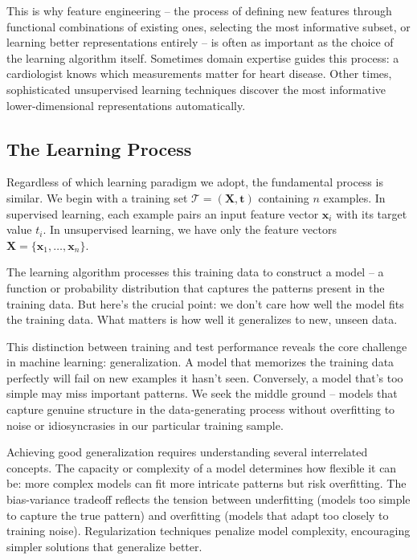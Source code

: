 This is why \alert{feature engineering} -- the process of defining new features through functional combinations of existing ones, selecting the most informative subset, or learning better representations entirely -- is often as important as the choice of the learning algorithm itself. Sometimes domain expertise guides this process: a cardiologist knows which measurements matter for heart disease. Other times, sophisticated unsupervised learning techniques discover the most informative lower-dimensional representations automatically.


\subsection*{The Learning Process}

Regardless of which learning paradigm we adopt, the fundamental process is similar. We begin with a \alert{training set} $\mathcal{T} = (\mathbf{X}, \mathbf{t})$ containing $n$ examples. In supervised learning, each example pairs an input feature vector $\mathbf{x}_i$ with its target value $t_i$. In unsupervised learning, we have only the feature vectors $\mathbf{X} = \{\mathbf{x}_1, \ldots, \mathbf{x}_n\}$.

The learning algorithm processes this training data to construct a model -- a function or probability distribution that captures the patterns present in the training data. But here's the crucial point: we don't care how well the model fits the training data. What matters is how well it generalizes to new, unseen data.

This distinction between training and test performance reveals the core challenge in machine learning: \alert{generalization}. A model that memorizes the training data perfectly will fail on new examples it hasn't seen. Conversely, a model that's too simple may miss important patterns. We seek the middle ground -- models that capture genuine structure in the data-generating process without overfitting to noise or idiosyncrasies in our particular training sample.

Achieving good generalization requires understanding several interrelated concepts. The \alert{capacity} or \alert{complexity} of a model determines how flexible it can be: more complex models can fit more intricate patterns but risk overfitting. The \alert{bias-variance tradeoff} reflects the tension between underfitting (models too simple to capture the true pattern) and overfitting (models that adapt too closely to training noise). \alert{Regularization} techniques penalize model complexity, encouraging simpler solutions that generalize better. 
\medskip

